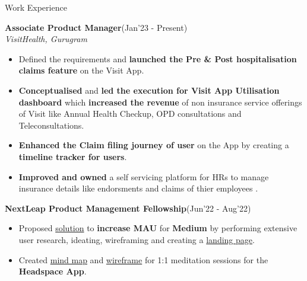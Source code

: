 \begin{rSection}{Work Experience}
\vspace{-.4cm}

\item{\bf {\bf Associate Product Manager}}\hfill{(Jan'23 - Present)}\\
\emph{VisitHealth, Gurugram}\\
[-0.4cm]

\begin{itemize}[leftmargin=*]

	\itemsep \sepval

	\item Defined the requirements and {\bf launched the Pre \& Post hospitalisation claims
		feature} on the Visit App.

	\item {\bf Conceptualised} and {\bf led the execution for Visit App Utilisation dashboard} which
		{\bf increased the revenue} of non insurance service offerings of Visit like Annual Health
		Checkup, OPD consultations and Teleconsultations.

	\item {\bf Enhanced the Claim filing journey of user} on the App by creating a {\bf timeline
		tracker for users}.

	\item {\bf Improved and owned} a self servicing platform for HRs to manage insurance
		details like endorsments and claims of thier employees .

\end{itemize}
\vspace{-.2cm}

\item{\bf {\bf NextLeap Product Management Fellowship}}\hfill{(Jun'22 - Aug'22)}\\
[-0.4cm]

\begin{itemize}[leftmargin=*]

	\itemsep \sepval

	\item Proposed \href{https://drive.google.com/drive/u/0/folders/1WsIuj0mg7Tzor1ZqkgHoIVEpC83IzDQO}{solution} to {\bf increase MAU} for {\bf Medium} by performing extensive user research, ideating, wireframing and creating a \href{https://mediummau.unicornplatform.page/}{landing page}.

	\item Created \href{https://drive.google.com/file/d/1-avX66iiwxiya52PV7Py78P-dR9KBc26/view?usp=sharing}{mind map} and \href{https://drive.google.com/file/d/1Q1WOr4dA-qPECZdUN8NicpNdlkdFcFjl/view?usp=sharing}{wireframe} for 1:1 meditation sessions for the {\bf Headspace App}.


\end{itemize}
\end{rSection}
